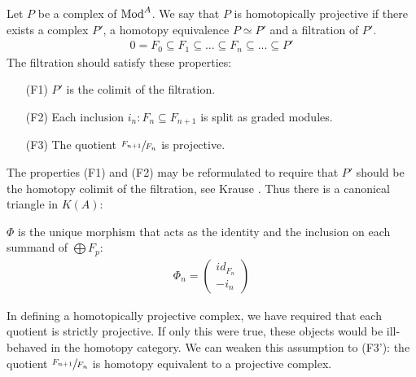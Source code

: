 \documentclass[../thesis.tex]{subfiles}
\begin{document}
            \begin{definition}
                Let $P$ be a complex of $\tt{Mod}^A$. We say that $P$ is homotopically projective if there exists a complex $P'$, a homotopy equivalence $P \simeq P'$ and a filtration of $P'$.
                \begin{align*}
                    0 = F_0 \subseteq F_1 \subseteq ... \subseteq F_n \subseteq ... \subseteq P'
                \end{align*}
                The filtration should satisfy these properties:
                \begin{itemize}
                    \item[(F1)] $P'$ is the colimit of the filtration.
                    \item[(F2)] Each inclusion $i_n : F_n \subseteq F_{n+1}$ is split as graded modules.
                    \item[(F3)] The quotient $\sfrac{F_{n+1}}{F_n}$ is projective.
                \end{itemize}
            \end{definition}

            \begin{remark}
                The properties (F1) and (F2) may be reformulated to require that $P'$ should be the homotopy colimit of the filtration, see Krause \cite{Krause21}. Thus there is a canonical triangle in $K(A)$:
                \begin{center}
                \end{center}
                $\Phi$ is the unique morphism that acts as the identity and the inclusion on each summand of $\bigoplus F_p$:
                \begin{align*}
                    \Phi_n = \begin{pmatrix}
                        id_{F_n} \\ -i_n
                    \end{pmatrix}
                \end{align*}
            \end{remark}

            In defining a homotopically projective complex, we have required that each quotient is strictly projective. If only this were true, these objects would be ill-behaved in the homotopy category. We can weaken this assumption to (F3'): the quotient $\sfrac{F_{n+1}}{F_n}$ is homotopy equivalent to a projective complex.
\end{document}
